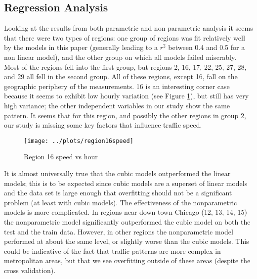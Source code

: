 \documentclass[12pt]{article}
\begin{document}
\subsection{Regression Analysis}
Looking at the results from both parametric and non parametric analysis it seems that there were two types of regions: one group of regions was fit relatively well by the models in this paper (generally leading to a $r^2$ between 0.4 and 0.5 for a non linear model), and the other group on which all models failed miserably. Most of the regions fell into the first group, but regions 2, 16, 17, 22, 25, 27, 28, and 29 all fell in the second group. All of these regions, except 16, fall on the geographic periphery of the measurements. 16 is an interesting corner case because it seems to exhibit low hourly variation (see Figure \ref{region16speed}), but still has very high variance; the other independent variables in our study show the same pattern. It seems that for this region, and possibly the other regions in group 2, our study is missing some key factors that influence traffic speed.
\begin{figure}[!ht]
\centering
\texttt{[image: ../plots/region16speed]}
\caption{Region 16 speed vs hour}
\label{region16speed}
\end{figure}

It is almost universally true that the cubic models outperformed the linear models; this is to be expected since cubic models are a superset of linear models and the data set is large enough that overfitting should not be a significant problem (at least with cubic models). The effectiveness of the nonparametric models is more complicated. In regions near down town Chicago (12, 13, 14, 15) the nonparametric model significantly outperformed the cubic model on both the test and the train data. However, in other regions the nonparametric model performed at about the same level, or slightly worse than the cubic models. This could be indicative of the fact that traffic patterns are more complex in metropolitan areas, but that we see overfitting outside of these areas (despite the cross validation).
\end{document}
